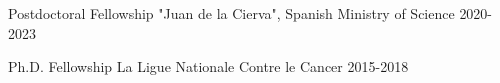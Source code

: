 

\begin{center}  \end{center}


\begin{cvhonors}

     \cvhonor
    {Postdoctoral Fellowship} %
    {"Juan de la Cierva", Spanish Ministry of Science} %
    {2020-2023} %
    {}
    
    \cvhonor
    {Ph.D. Fellowship} %
    {La Ligue Nationale Contre le Cancer} %
    {2015-2018} %
    {}
    
\end{cvhonors}

